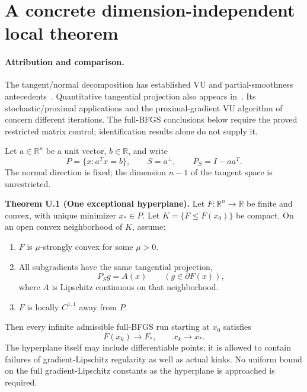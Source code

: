 \begingroup

\setcounter{section}{0}
\setcounter{theorem}{0}
\setcounter{lemma}{0}
\setcounter{corollary}{0}
\setcounter{proposition}{0}
\setcounter{remark}{0}
\setcounter{equation}{0}
\section{A concrete dimension-independent local
theorem}\label{U:a-concrete-dimension-independent-local-theorem}
\paragraph{Attribution and comparison.}
The tangent/normal decomposition has established VU and partial-smoothness antecedents~\cite{geom_Lewis2002,LL}. Quantitative tangential projection also appears in~\cite{geom_DDJ2026}. Its stochastic/proximal applications and the proximal-gradient VU algorithm of~\cite{geom_LSS2025} concern different iterations. The full-BFGS conclusions below require the proved restricted matrix control; identification results alone do not supply it.


Let \(a\in\mathbb R^n\) be a unit vector, \(b\in\mathbb R\), and write
\[
 P=\{x:a^Tx=b\},\qquad S=a^\perp,\qquad P_S=I-aa^T.
\] The normal direction is fixed; the dimension \(n-1\) of the tangent
space is unrestricted.

\label{U:one}\textbf{Theorem U.1 (One exceptional hyperplane).} Let
\(F:\mathbb R^n\to\mathbb R\) be finite and convex, with unique
minimizer \(x_*\in P\). Let \(K=\{F\le F(x_0)\}\) be compact. On an open
convex neighborhood of \(K\), assume:

\begin{enumerate}
\def\labelenumi{\arabic{enumi}.}
\tightlist
\item
  \(F\) is \(\mu\)-strongly convex for some \(\mu>0\).
\item
  All subgradients have the same tangential projection,
  \[P_Sg=A(x)\qquad(g\in\partial F(x)),\] where \(A\) is Lipschitz
  continuous on that neighborhood.
\item
  \(F\) is locally \(C^{1,1}\) away from \(P\).
\end{enumerate}

Then every infinite admissible full-BFGS run starting at \(x_0\)
satisfies \[
 \boxed{F(x_k)\to F_*,\qquad x_k\to x_*.}
\] The hyperplane itself may include differentiable points; it is
allowed to contain failures of gradient-Lipschitz regularity as well as
actual kinks. No uniform bound on the full gradient-Lipschitz constants
as the hyperplane is approached is required.

